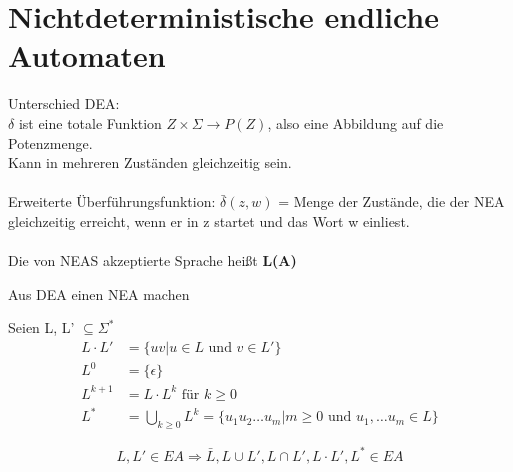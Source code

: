 \documentclass[14pt]{article}
\begin{document}
\section{Nichtdeterministische endliche Automaten}
Unterschied DEA: \\
$\delta$ ist eine totale Funktion $Z \times \varSigma \rightarrow P(Z)$, also
eine Abbildung auf die Potenzmenge. \\
Kann in mehreren Zuständen gleichzeitig sein. \\
\\
Erweiterte Überführungsfunktion: $\bar{\delta}(z, w)$ = Menge der Zustände, die der NEA
gleichzeitig erreicht, wenn er in z startet und das Wort w einliest. \\
\\
Die von NEAS akzeptierte Sprache heißt \textbf{L(A)}
\begin{definition}[Potenzmengenkonstruktion]
    Aus DEA einen NEA machen
\end{definition}
\begin{definition}
    Seien L, L' $\subseteq \varSigma^*$
    \begin{align*}
        L \cdot L' & = \{ uv | u \in L \text{ und } v \in L' \} \\
        L^0         & = \{ \epsilon \} \\
        L^{k + 1} &= L \cdot L^k \text{ für } k \geq 0 \\
        L^* &= \bigcup_{k \geq 0} L^k = \{ u_1u_2 \dots u_m 
        | m \geq 0 \text{ und } u_1, \dots u_m \in L \}
    \end{align*}
\end{definition}
\begin{definition}
    \[
        L, L' \in EA \Rightarrow \bar{L}, L \cup L', L \cap L', L \cdot L', L^* \in EA  
    \]
\end{definition}
\end{document}
